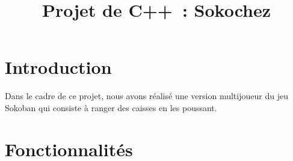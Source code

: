 \documentclass{article}
\begin{document}
\title{Projet de C++ : Sokochez}
\date{}
\maketitle

\section{Introduction}

Dans le cadre de ce projet, nous avons réalisé une version multijoueur du jeu Sokoban qui consiste à ranger des caisses en les poussant. \\

\section{Fonctionnalités}
\end{document}

